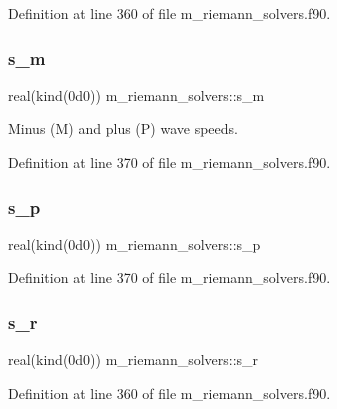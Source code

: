Definition at line 360 of file m\+\_\+riemann\+\_\+solvers.\+f90.

\mbox{\label{namespacem__riemann__solvers_a418fedb6a95524db57eeb364db8c5c0c}} 
\subsubsection{\texorpdfstring{s\+\_\+m}{s\_m}}
{\footnotesize\ttfamily real(kind(0d0)) m\+\_\+riemann\+\_\+solvers\+::s\+\_\+m}



Minus (M) and plus (P) wave speeds. 



Definition at line 370 of file m\+\_\+riemann\+\_\+solvers.\+f90.

\mbox{\label{namespacem__riemann__solvers_ae941c64575d69a7b369f9f5bb921a384}} 
\subsubsection{\texorpdfstring{s\+\_\+p}{s\_p}}
{\footnotesize\ttfamily real(kind(0d0)) m\+\_\+riemann\+\_\+solvers\+::s\+\_\+p}



Definition at line 370 of file m\+\_\+riemann\+\_\+solvers.\+f90.

\mbox{\label{namespacem__riemann__solvers_ac5cbbc98622cdafe56142b26d67ad2d9}} 
\subsubsection{\texorpdfstring{s\+\_\+r}{s\_r}}
{\footnotesize\ttfamily real(kind(0d0)) m\+\_\+riemann\+\_\+solvers\+::s\+\_\+r}



Definition at line 360 of file m\+\_\+riemann\+\_\+solvers.\+f90.

